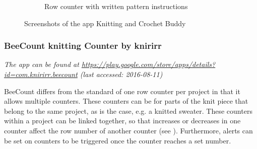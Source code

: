 \begin{figure}[H]
\begin{subfigure}[b]{0.33\textwidth}
        \caption[Row counter with written pattern instructions ]{Row counter with written pattern instructions}
      \label{fig:knit_tink_project_setup}
    \end{subfigure}
  \caption[Screenshots of the app Knitting and Crochet Buddy ]{Screenshots of the app Knitting and Crochet Buddy}
\end{figure}

\subsubsection*{BeeCount knitting Counter by knirirr}

\textit{ The app can be found at \url{https://play.google.com/store/apps/details?id=com.knirirr.beecount} \small{(last accessed: 2016-08-11)}}
\vspace*{0.5cm}

\noindent BeeCount differs from the standard of one row counter per project in that it allows multiple counters. These counters can be for parts of the knit piece that  belong to the same project, as is the case, e.g. a knitted sweater. These counters within a project can be linked together, so that increases or decreases in one counter affect the row number of another counter (see ). Furthermore, alerts can be set on counters to be triggered once the counter
reaches a set number.

